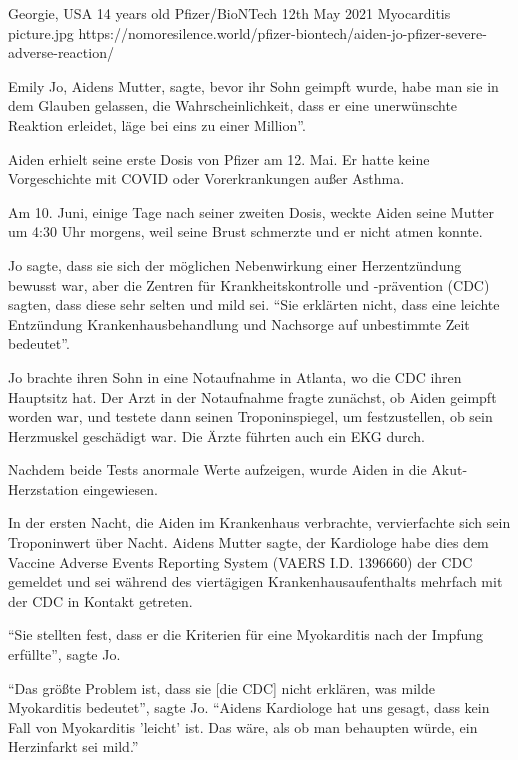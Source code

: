           {Georgie, USA}
          {14 years old}
          {Pfizer/BioNTech}
          {12th May 2021}
          {Myocarditis}
          {picture.jpg}
          {https://nomoresilence.world/pfizer-biontech/aiden-jo-pfizer-severe-adverse-reaction/}
          {

\normalsize

Emily Jo, Aidens Mutter, sagte, bevor ihr Sohn geimpft wurde, habe man sie in
dem Glauben gelassen, die Wahrscheinlichkeit, dass er eine unerwünschte Reaktion
erleidet, läge bei eins zu einer Million''.

Aiden erhielt seine erste Dosis von Pfizer am 12. Mai. Er hatte keine
Vorgeschichte mit COVID oder Vorerkrankungen außer Asthma.

Am 10. Juni, einige Tage nach seiner zweiten Dosis, weckte Aiden seine Mutter um
4:30 Uhr morgens, weil seine Brust schmerzte und er nicht atmen konnte.

Jo sagte, dass sie sich der möglichen Nebenwirkung einer Herzentzündung bewusst
war, aber die Zentren für Krankheitskontrolle und -prävention (CDC) sagten, dass
diese sehr selten und mild sei. ``Sie erklärten nicht, dass eine leichte
Entzündung Krankenhausbehandlung und Nachsorge auf unbestimmte Zeit bedeutet''.

Jo brachte ihren Sohn in eine Notaufnahme in Atlanta, wo die CDC ihren Hauptsitz
hat. Der Arzt in der Notaufnahme fragte zunächst, ob Aiden geimpft worden war,
und testete dann seinen Troponinspiegel, um festzustellen, ob sein Herzmuskel
geschädigt war. Die Ärzte führten auch ein EKG durch.

Nachdem beide Tests anormale Werte aufzeigen, wurde Aiden in die
Akut-Herzstation eingewiesen.

In der ersten Nacht, die Aiden im Krankenhaus verbrachte, vervierfachte sich
sein Troponinwert über Nacht. Aidens Mutter sagte, der Kardiologe habe dies dem
Vaccine Adverse Events Reporting System (VAERS I.D. 1396660) der CDC gemeldet
und sei während des viertägigen Krankenhausaufenthalts mehrfach mit der CDC in
Kontakt getreten.

``Sie stellten fest, dass er die Kriterien für eine Myokarditis nach der Impfung
erfüllte'', sagte Jo.

``Das größte Problem ist, dass sie [die CDC] nicht erklären, was milde
Myokarditis bedeutet'', sagte Jo. ``Aidens Kardiologe hat uns gesagt, dass kein
Fall von Myokarditis 'leicht' ist. Das wäre, als ob man behaupten würde, ein
Herzinfarkt sei mild.''

}
